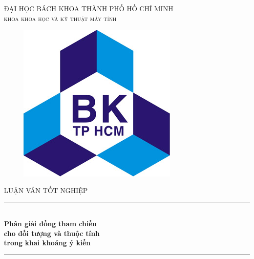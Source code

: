 \documentclass[12pt]{report}
\begin{document}
\usetikzlibrary{arrows,chains,positioning,scopes}


\begin{titlepage}

\newcommand{\HRule}{\rule{\linewidth}{0.5mm}} %

\center %
 
\begin{flushright}
\end{flushright}
\textsc{\large ĐẠI HỌC BÁCH KHOA THÀNH PHỐ HỒ CHÍ MINH}\\[0.2cm]
\textsc{\Large \scshape khoa khoa học và kỹ thuật máy tính}\\[0.5cm]
\begin{figure}[H] 
\centering
\includegraphics[scale=1.6]{images/logo.jpg}
\end{figure} 

\textsc{\large LUẬN VĂN TỐT NGHIỆP}\\[0.2cm] %

\HRule \\[0.4cm]
{ \huge \bfseries Phân giải đồng tham chiếu \\ cho đối tượng và thuộc tính \\ trong khai khoáng ý kiến}\\[0.4cm] %
\HRule \\[0.8cm]


\end{titlepage}
\end{document}
